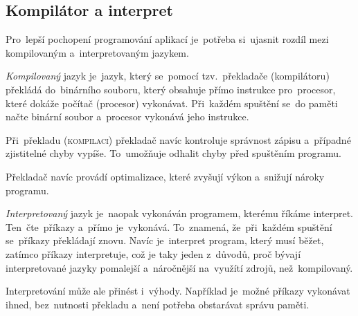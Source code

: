 \documentclass[14pt,a4paper]{article}
\begin{document}
        \subsection{Kompilátor a interpret}
        Pro~lepší pochopení programování aplikací je~potřeba si~ujasnit rozdíl mezi kompilovaným a~interpretovaným jazykem.

        \emph{Kompilovaný} jazyk je~jazyk, který se~pomocí tzv.~překladače (kompilátoru) překládá do~binárního souboru, který obsahuje přímo instrukce pro~procesor, které dokáže počítač (procesor) vykonávat. Při~každém spuštění se~do paměti načte binární soubor a~procesor vykonává jeho instrukce.
        
        Při~překladu (\textsc{kompilaci}) překladač navíc kontroluje správnost zápisu a~případné zjistitelné chyby vypíše. To~umožňuje odhalit chyby před spuštěním programu.

        Překladač navíc provádí optimalizace, které zvyšují výkon a~snižují nároky programu.

        \emph{Interpretovaný} jazyk je~naopak vykonáván programem, kterému říkáme interpret. Ten~čte~příkazy a~přímo je~vykonává. To~znamená, že~při~každém spuštění se~příkazy překládají znovu. Navíc je~interpret program, který musí běžet, zatímco příkazy interpretuje, což je taky jeden z~důvodů, proč bývají interpretované jazyky pomalejší a~náročnější na~využítí zdrojů, než~kompilovaný.
        
        Interpretování může ale přinést i~výhody. Například je~možné příkazy vykonávat ihned, bez~nutnosti překladu a~není potřeba obstarávat správu paměti. \cite{ueda:compiled}
        
\end{document}
